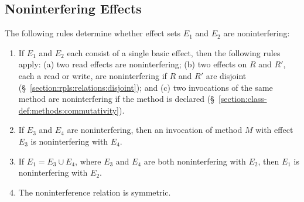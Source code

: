 \subsection{Noninterfering Effects}
\label{section:effects:noninterference}

The following rules determine whether effect sets $E_1$ and $E_2$ are
noninterfering:
%
\begin{enumerate}
%
\item If $E_1$ and $E_2$ each consist of a single basic effect, then
  the following rules apply: (a) two read effects are noninterfering;
  (b) two effects on $R$ and $R'$, each a read or write, are
  noninterfering if $R$ and $R'$ are disjoint
  (\S~\ref{section:rpls:relations:disjoint}); and (c) two invocations
  of the same method are noninterfering if the method is declared
  (\S~\ref{section:class-def:methods:commutativity}).
%
\item If $E_3$ and $E_4$ are noninterfering, then an invocation of
  method $M$ with effect $E_3$ is noninterfering with $E_4$.
%
\item If $E_1 = E_3 \cup E_4$, where $E_3$ and $E_4$ are both
  noninterfering with $E_2$, then $E_1$ is noninterfering with $E_2$.
%
\item The noninterference relation is symmetric.
%
\end{enumerate}



